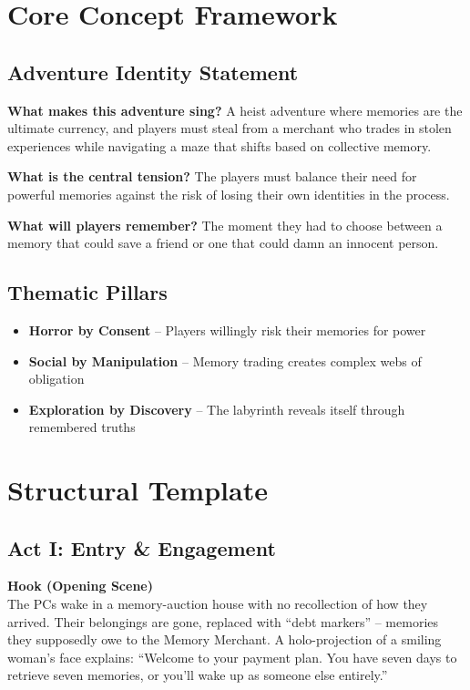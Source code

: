 \documentclass[11pt]{article}
\begin{document}




\section*{Core Concept Framework}

\subsection*{Adventure Identity Statement}
\textbf{What makes this adventure sing?} A heist adventure where memories are the ultimate currency, and players must steal from a merchant who trades in stolen experiences while navigating a maze that shifts based on collective memory.

\textbf{What is the central tension?} The players must balance their need for powerful memories against the risk of losing their own identities in the process.

\textbf{What will players remember?} The moment they had to choose between a memory that could save a friend or one that could damn an innocent person.

\subsection*{Thematic Pillars}
\begin{itemize}[leftmargin=*]
  \item \textbf{Horror by Consent} -- Players willingly risk their memories for power
  \item \textbf{Social by Manipulation} -- Memory trading creates complex webs of obligation
  \item \textbf{Exploration by Discovery} -- The labyrinth reveals itself through remembered truths
\end{itemize}

\section*{Structural Template}

\subsection*{Act I: Entry \& Engagement}

\textbf{Hook (Opening Scene)} \\
The PCs wake in a memory-auction house with no recollection of how they arrived. Their belongings are gone, replaced with ``debt markers'' -- memories they supposedly owe to the Memory Merchant. A holo-projection of a smiling woman's face explains: ``Welcome to your payment plan. You have seven days to retrieve seven memories, or you'll wake up as someone else entirely.''
\end{document}
